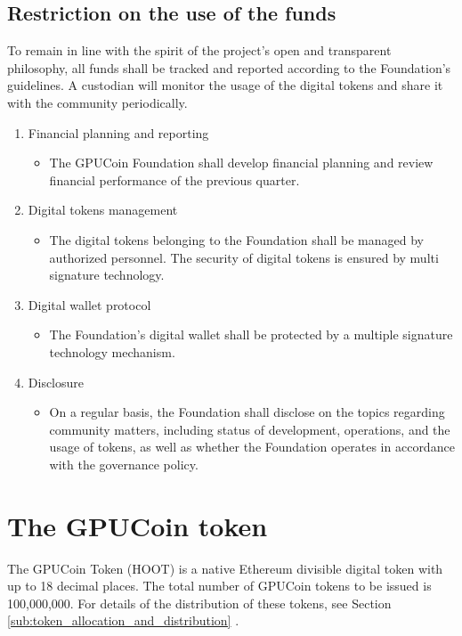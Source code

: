 \documentclass{article}
\begin{document}
\subsection{Restriction on the use of the funds} %
\label{sub:restriction_on_the_use_of_the_funds}
To remain in line with the spirit of the project’s open and transparent philosophy, all funds shall be tracked and reported according to the Foundation’s guidelines. A custodian will monitor the usage of the digital tokens and share it with the community periodically.

\begin{enumerate}
 \item Financial planning and reporting
 \begin{itemize}
 \item The GPUCoin Foundation shall develop financial planning and review financial performance of the previous quarter.
 \end{itemize}

 \item Digital tokens management
 \begin{itemize}
 \item The digital tokens belonging to the Foundation shall be managed by authorized personnel. The security of digital tokens is ensured by multi signature technology.
 \end{itemize}

 \item Digital wallet protocol
 \begin{itemize}
 \item The Foundation’s digital wallet shall be protected by a multiple signature technology mechanism.
 \end{itemize}

 \item Disclosure
 \begin{itemize}
 \item On a regular basis, the Foundation shall disclose on the topics regarding community matters, including status of development, operations, and the usage of tokens, as well as whether the Foundation operates in accordance with the governance policy.
 \end{itemize}
\end{enumerate}


\section{The GPUCoin token}
The GPUCoin Token (HOOT) is a native Ethereum divisible digital token with up to 18 decimal places. The total number of GPUCoin tokens to be issued is 100,000,000. For details of the distribution of these tokens, see Section \ref{sub:token_allocation_and_distribution} .
\end{document}
